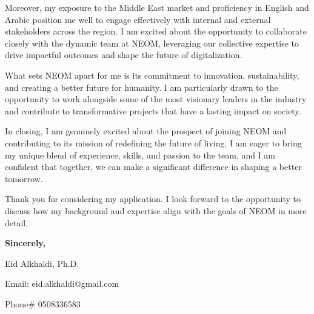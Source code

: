 \documentclass[11pt]{article}
\begin{document}
Moreover, my exposure to the Middle East market and proficiency in English and Arabic position me well to engage effectively with internal and external stakeholders across the region. I am excited about the opportunity to collaborate closely with the dynamic team at NEOM, leveraging our collective expertise to drive impactful outcomes and shape the future of digitalization.

What sets NEOM apart for me is its commitment to innovation, sustainability, and creating a better future for humanity. I am particularly drawn to the opportunity to work alongside some of the most visionary leaders in the industry and contribute to transformative projects that have a lasting impact on society.

In closing, I am genuinely excited about the prospect of joining NEOM and contributing to its mission of redefining the future of living. I am eager to bring my unique blend of experience, skills, and passion to the team, and I am confident that together, we can make a significant difference in shaping a better tomorrow.

Thank you for considering my application. I look forward to the opportunity to discuss how my background and expertise align with the goals of NEOM in more detail.

\textbf{Sincerely,}

Eid Alkhaldi, Ph.D. 

Email: eid.alkhaldi@gmail.com

Phone\# 0508336583
\end{document}
